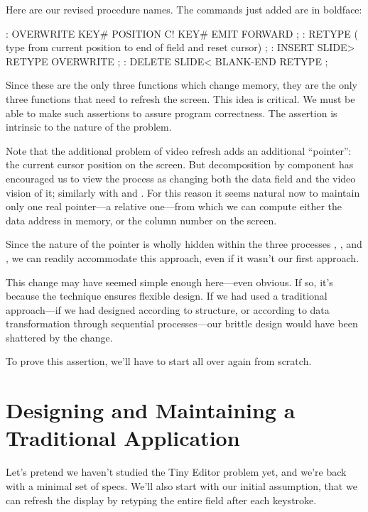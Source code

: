 Here are our revised procedure names. The commands just added
are in boldface:

\begin{Code}
: OVERWRITE KEY# POSITION C! KEY# EMIT FORWARD ;
: RETYPE ( type from current position to
   end of field and reset cursor) ;
: INSERT SLIDE> RETYPE OVERWRITE ;
: DELETE SLIDE< BLANK-END RETYPE ;
\end{Code}
Since these are the only three functions which change memory, they are
the only three functions that need to refresh the screen. This idea is
critical. We must be able to make such assertions to assure program
correctness. The assertion is intrinsic to the nature of the problem.

Note that the additional problem of video refresh adds an additional
``pointer'': the current cursor position on the screen. But decomposition
by component has encouraged us to view the  process as
changing both the data field and the video vision of it; similarly with
 and . For this reason it seems natural
now to maintain only one real pointer---a relative one---from which we
can compute either the data address in memory, or the column number on
the screen.

Since the nature of the pointer is wholly hidden within the three
processes , , and , we
can readily accommodate this approach, even if it wasn't our first
approach.

This change may have seemed simple enough here---even obvious. If so,
it's because the technique ensures flexible design. If we had used a
traditional approach---if we had designed according to structure, or
according to data transformation through sequential processes---our
brittle design would have been shattered by the change.

To prove this assertion, we'll have to start all over again from
scratch.

\section{Designing and Maintaining a Traditional Application}

Let's pretend we haven't studied the Tiny Editor problem yet, and
we're back with a minimal set of specs. We'll also start with our
initial assumption, that we can refresh the display by retyping the
entire field after each keystroke.

